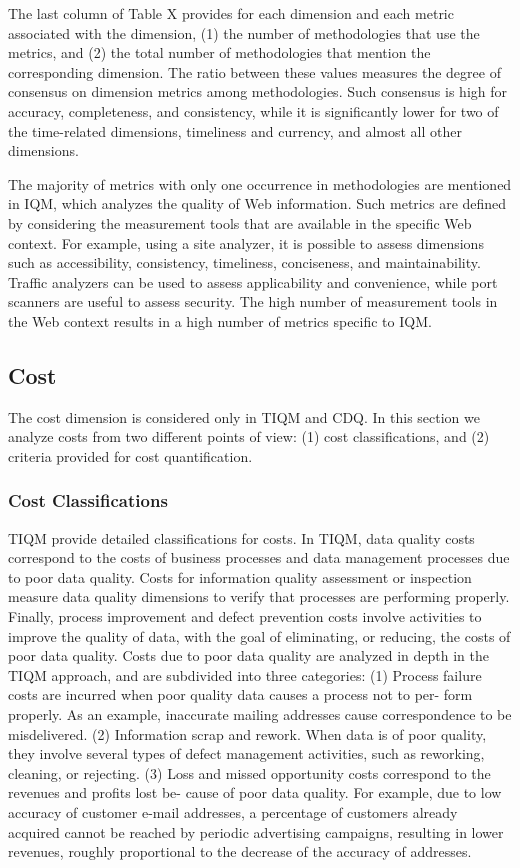\documentclass[pdftex,english,oribibl]{llncs}
\begin{document}
The last column of Table X provides for each dimension and each metric associated with the dimension, (1) the number of methodologies that use the metrics, and (2) the total number of methodologies that mention the corresponding dimension.
The ratio between these values measures the degree of consensus on dimension metrics among methodologies.
Such consensus is high for accuracy, completeness, and consistency, while it is significantly lower for two of the time-related dimensions, timeliness and currency, and almost all other dimensions.

The majority of metrics with only one occurrence in methodologies are mentioned in IQM, which analyzes the quality of Web information.
Such metrics are defined by considering the measurement tools that are available in the specific Web context.
For example, using a site analyzer, it is possible to assess dimensions such as accessibility, consistency, timeliness, conciseness, and maintainability.
Traffic analyzers can be used to assess applicability and convenience, while port scanners are useful to assess security.
The high number of measurement tools in the Web context results in a high number of metrics specific to IQM.

\subsection{Cost}
The cost dimension is considered only in TIQM and CDQ.
In this section we analyze costs from two different points of view: (1) cost classifications, and (2) criteria provided for cost quantification.


\subsubsection{Cost Classifications}
TIQM  provide detailed classifications for costs.
In TIQM, data quality costs correspond to the costs of business processes and data management processes due to poor data quality. Costs for information quality assessment or inspection measure data quality dimensions to verify that processes are performing properly. Finally, process improvement and defect prevention costs involve activities to improve the quality of data, with the goal of eliminating, or reducing, the costs of poor data quality. Costs due to poor data quality are analyzed in depth in the TIQM approach, and are subdivided into three categories:
(1) Process failure costs are incurred when poor quality data causes a process not to per- form properly. As an example, inaccurate mailing addresses cause correspondence to be misdelivered.
(2) Information scrap and rework. When data is of poor quality, they involve several types of defect management activities, such as reworking, cleaning, or rejecting.
(3) Loss and missed opportunity costs correspond to the revenues and profits lost be- cause of poor data quality. For example, due to low accuracy of customer e-mail addresses, a percentage of customers already acquired cannot be reached by periodic advertising campaigns, resulting in lower revenues, roughly proportional to the decrease of the accuracy of addresses.
\end{document}
